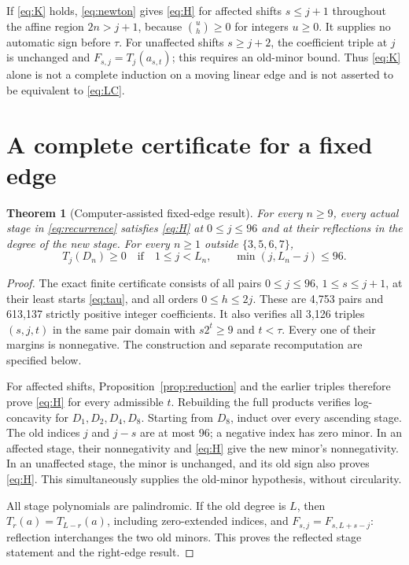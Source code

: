 \documentclass[11pt]{article}
\newtheorem{theorem}{Theorem}
\begin{document}
If \eqref{eq:K} holds, \eqref{eq:newton} gives \eqref{eq:H} for affected
shifts $s\leq j+1$ throughout the affine region $2n>j+1$, because
$\binom uh\geq0$ for integers $u\geq0$. It supplies no automatic sign
before $\tau$. For unaffected shifts $s\geq j+2$, the coefficient triple
at $j$ is unchanged and $F_{s,j}=T_j(a_{s,t})$; this requires an old-minor
bound. Thus \eqref{eq:K} alone is not a complete induction on a moving
linear edge and is not asserted to be equivalent to \eqref{eq:LC}.

\section{A complete certificate for a fixed edge}

\begin{theorem}[Computer-assisted fixed-edge result]\label{thm:edge}
For every $n\geq9$, every actual stage in \eqref{eq:recurrence} satisfies
\eqref{eq:H} at $0\leq j\leq96$ and at their reflections in the degree
of the new stage. For every $n\geq1$ outside $\{3,5,6,7\}$,
\[
 T_j(D_n)\geq0\quad\text{if}\quad
 1\leq j<L_n,\qquad \min(j,L_n-j)\leq96.
\]
\end{theorem}

\begin{proof}
The exact finite certificate consists of all pairs
$0\leq j\leq96$, $1\leq s\leq j+1$, at their least starts
\eqref{eq:tau}, and all orders $0\leq h\leq2j$. These are 4,753 pairs
and 613,137 strictly positive integer coefficients. It also verifies all
3,126 triples $(s,j,t)$ in the same pair domain with $s2^t\geq9$ and
$t<\tau$. Every one of their margins is nonnegative. The construction
and separate recomputation are specified below.

For affected shifts, Proposition~\ref{prop:reduction} and the earlier
triples therefore prove \eqref{eq:H} for every admissible $t$.
Rebuilding the full products verifies log-concavity for $D_1,D_2,D_4,D_8$.
Starting from $D_8$, induct over every ascending stage. The old indices
$j$ and $j-s$ are at most 96; a negative index has zero minor. In an
affected stage, their nonnegativity and \eqref{eq:H} give the new minor's
nonnegativity. In an unaffected stage, the minor is unchanged, and its
old sign also proves \eqref{eq:H}. This simultaneously supplies the
old-minor hypothesis, without circularity.

All stage polynomials are palindromic. If the old degree is $L$, then
$T_r(a)=T_{L-r}(a)$, including zero-extended indices, and
$F_{s,j}=F_{s,L+s-j}$: reflection interchanges the two old minors.
This proves the reflected stage statement and the right-edge result.
\end{proof}
\end{document}
